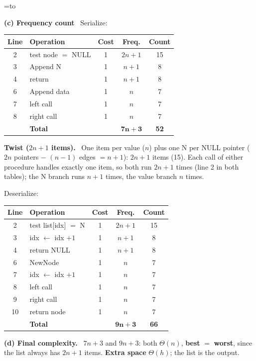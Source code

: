 \documentclass[10pt]{article}
\makeatletter
\newcounter{qnum}
\newif\iffirstrow
\newcommand{\qrowh}[2]{\expandafter\gdef\csname qrowh@#1\endcsname{#2}}
\newcommand{\Lcol}[1][0.505]{\par\noindent\setbox\rowbox=\hbox to\linewidth\bgroup\begin{minipage}[t]{#1\linewidth}\vspace{0pt}}
\newcommand{\Rcol}[1][0.47]{\end{minipage}\hfill\begin{minipage}[t]{#1\linewidth}\vspace{0pt}}
\newcommand{\Ecol}{\end{minipage}\egroup
  \iffirstrow\immediate\write\@auxout{\string\qrowh{\theqnum}{\the\dimexpr\ht\rowbox+\dp\rowbox\relax}}\global\firstrowfalse\fi
  \noindent\usebox\rowbox\par\vspace{3pt}}
\newcommand{\pt}[1]{{\bfseries\color{headc}#1}\ }
\newcommand{\fhead}[1][Count]{Line & Operation & Cost & Freq. & #1 \\ \midrule}
\makeatother
\begin{document}
\Lcol[0.485]
\pt{(c) Frequency count} {\footnotesize Serialize:}\par
{\footnotesize\begin{tabularx}{\linewidth}{@{}c Y c c c@{}}\toprule\fhead
2 & test node $=$ NULL & 1 & $2n+1$ & 15 \\
3 & Append N & 1 & $n+1$ & 8 \\
4 & return & 1 & $n+1$ & 8 \\
6 & Append data & 1 & $n$ & 7 \\
7 & left call & 1 & $n$ & 7 \\
8 & right call & 1 & $n$ & 7 \\ \midrule
 & \textbf{Total} & & $\mathbf{7n+3}$ & \textbf{52} \\ \bottomrule
\end{tabularx}}
\pt{Twist ($2n+1$ items).} One item per value ($n$) plus one N per NULL pointer ($2n$ pointers $-$ $(n-1)$ edges $= n+1$): $2n+1$ items (15). Each call of either procedure handles exactly one item, so both run $2n+1$ times (line 2 in both tables); the N branch runs $n+1$ times, the value branch $n$ times.
\Rcol[0.495]
{\footnotesize Deserialize:}\par
{\footnotesize\begin{tabularx}{\linewidth}{@{}c Y c c c@{}}\toprule\fhead
2 & test list[idx] $=$ N & 1 & $2n+1$ & 15 \\
3 & idx $\gets$ idx $+1$ & 1 & $n+1$ & 8 \\
4 & return NULL & 1 & $n+1$ & 8 \\
6 & NewNode & 1 & $n$ & 7 \\
7 & idx $\gets$ idx $+1$ & 1 & $n$ & 7 \\
8 & left call & 1 & $n$ & 7 \\
9 & right call & 1 & $n$ & 7 \\
10 & return node & 1 & $n$ & 7 \\ \midrule
 & \textbf{Total} & & $\mathbf{9n+3}$ & \textbf{66} \\ \bottomrule
\end{tabularx}}
\pt{(d) Final complexity.} $7n+3$ and $9n+3$: both $\Theta(n)$, \textbf{best} $=$ \textbf{worst}, since the list always has $2n+1$ items. \textbf{Extra space} $\Theta(h)$; the list is the output.
\Ecol
\end{document}

